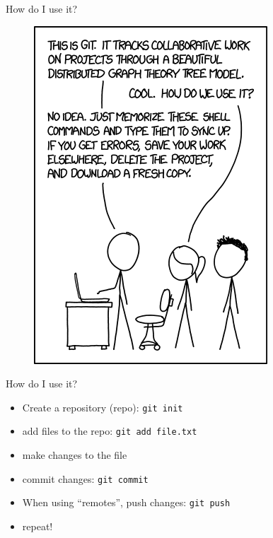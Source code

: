 \documentclass{beamer}
\begin{document}
\begin{frame}{How do I use it?}

  \begin{figure}
    \centering
    \includegraphics[height=0.9\textheight]{git}
  \end{figure}
  
\end{frame}

\begin{frame}[fragile]{How do I use it?}
  \begin{itemize}
  \item Create a repository (repo): \verb|git init|
  \item add files to the repo: \verb|git add file.txt|
  \item make changes to the file
  \item commit changes: \verb|git commit|
  \item When using ``remotes'', push changes: \verb|git push|
  \item repeat!
  \end{itemize}

\end{frame}

\end{document}
